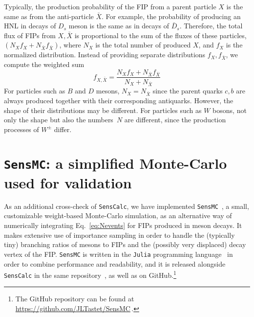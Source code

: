 \documentclass[
    aps,prd,
    twocolumn,
    nofootinbib,
    superscriptaddress,
]{revtex4}
\begin{document}
Typically, the production probability of the FIP from a parent particle $X$ is the same as from the anti-particle $\bar{X}$. For example, the probability of producing an HNL in decays of $D_{s}$ meson is the same as in decays of $\bar{D}_{s}$. Therefore, the total flux of FIPs from $X,\bar{X}$ is proportional to the sum of the fluxes of these particles, $(N_{X}f_{X}+N_{\bar{X}}f_{\bar{X}})$, where $N_{X}$ is the total number of produced $X$, and $f_{X}$ is the normalized distribution. Instead of providing separate distributions $f_{X},f_{\bar{X}}$, we compute the weighted sum
\begin{equation}
    f_{X,\bar{X}} = \frac{N_{X}f_{X}+N_{\bar{X}}f_{\bar{X}}}{N_{X}+N_{\bar{X}}}
\end{equation}
For particles such as $B$ and $D$ mesons, $N_{X} = N_{\bar{X}}$ since the parent quarks $c,b$ are always produced together with their corresponding antiquarks. However, the shape of their distributions may be different. For particles such as $W$ bosons, not only the shape but also the numbers~$N$ are different, since the production processes of $W^\pm$ differ.


\section{\texttt{SensMC}: a simplified Monte-Carlo used for validation}
\label{app:toy-mc}
As an additional cross-check of \texttt{SensCalc}, we have implemented \texttt{SensMC}~\cite{SensMC-GitHub}, a small, customizable weight-based Monte-Carlo simulation, as an alternative way of numerically integrating Eq.~\eqref{eq:Nevents} for FIPs produced in meson decays. It makes extensive use of importance sampling in order to handle the (typically tiny) branching ratios of mesons to FIPs and the (possibly very displaced) decay vertex of the FIP. \texttt{SensMC} is written in the \texttt{Julia} programming language~\cite{julialang} in order to combine performance and readability, and it is released alongside \texttt{SensCalc} in the same repository~\cite{SensCalc-Zenodo}, as well as on GitHub.\footnote{The GitHub repository can be found at \url{https://github.com/JLTastet/SensMC}\,.}
\end{document}
